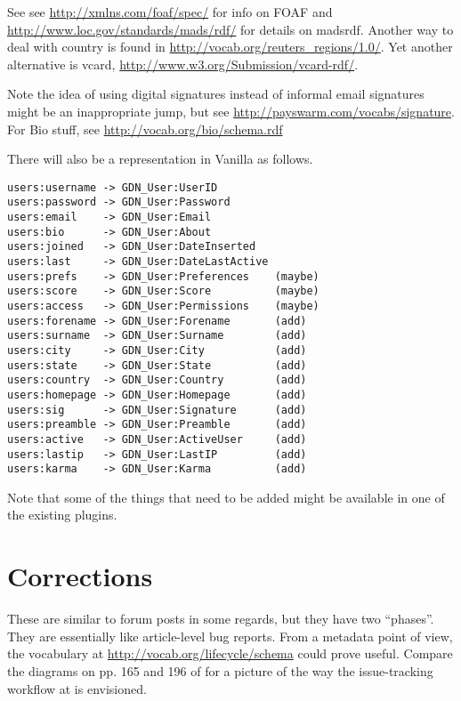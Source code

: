 \documentclass{article}
\begin{document}
See see \url{http://xmlns.com/foaf/spec/} for info on FOAF
and \url{http://www.loc.gov/standards/mads/rdf/} for
details on madsrdf.  Another way to deal with country is
found in \url{http://vocab.org/reuters_regions/1.0/}.  Yet
another alternative is vcard,
\url{http://www.w3.org/Submission/vcard-rdf/}.

Note the idea of using digital signatures instead of
informal email signatures might be an inappropriate jump,
but see \url{http://payswarm.com/vocabs/signature}.  For
Bio stuff, see \url{http://vocab.org/bio/schema.rdf}

There will also be a representation in Vanilla as follows.

\begin{verbatim}
users:username -> GDN_User:UserID
users:password -> GDN_User:Password
users:email    -> GDN_User:Email
users:bio      -> GDN_User:About
users:joined   -> GDN_User:DateInserted
users:last     -> GDN_User:DateLastActive
users:prefs    -> GDN_User:Preferences    (maybe)
users:score    -> GDN_User:Score          (maybe)
users:access   -> GDN_User:Permissions    (maybe)
users:forename -> GDN_User:Forename       (add)
users:surname  -> GDN_User:Surname        (add)
users:city     -> GDN_User:City           (add)
users:state    -> GDN_User:State          (add)
users:country  -> GDN_User:Country        (add)
users:homepage -> GDN_User:Homepage       (add)
users:sig      -> GDN_User:Signature      (add)
users:preamble -> GDN_User:Preamble       (add)
users:active   -> GDN_User:ActiveUser     (add)
users:lastip   -> GDN_User:LastIP         (add)
users:karma    -> GDN_User:Karma          (add)
\end{verbatim}

Note that some of the things that need to be added might
be available in one of the existing plugins.

\section{Corrections} \label{corrections}

These are similar to forum posts in some regards, but they
have two ``phases''.  They are essentially like
article-level bug reports.  From a metadata point of view,
the vocabulary at \url{http://vocab.org/lifecycle/schema}
could prove useful.  Compare the diagrams on pp. 165 and
196 of \cite{KrowneThesis} for a picture of the way the
issue-tracking workflow at is envisioned.
\end{document}
